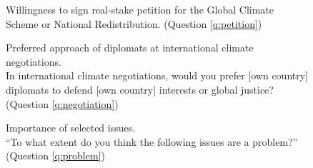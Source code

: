 \documentclass[12pt,english]{article}
\begin{document}
\begin{figure}[h!]
    \caption[Willingness to sign a real-stake petition]{Willingness to sign real-stake petition for the Global Climate Scheme or National Redistribution. (Question \ref{q:petition})}\label{fig:petition}
\end{figure}

\begin{figure}[h!]
    \caption[Preferred approach for international climate negotiations]{Preferred approach of diplomats at international climate negotiations. \\ In international climate negotiations, would you prefer [own country] diplomats to defend [own country] interests or global justice? (Question \ref{q:negotiation})}\label{fig:negotiation}
\end{figure}

\begin{figure}[h!]
    \caption[Importance of selected issues]{Importance of selected issues.\\ ``To what extent do you think the following issues are a problem?'' (Question \ref{q:problem})}\label{fig:problem}
\end{figure}
\end{document}
